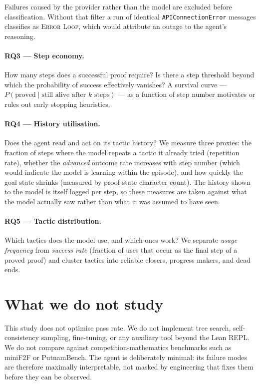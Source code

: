 Failures caused by the provider rather than the model are excluded before
classification. Without that filter a run of identical \texttt{APIConnectionError}
messages classifies as \textsc{Error Loop}, which would attribute an outage to the
agent's reasoning.

\paragraph{RQ3 --- Step economy.}
How many steps does a successful proof require?
Is there a step threshold beyond which the probability of success effectively vanishes?
A survival curve --- $P(\text{proved} \mid \text{still alive after } k \text{ steps})$ ---
as a function of step number motivates or rules out early stopping heuristics.

\paragraph{RQ4 --- History utilisation.}
Does the agent read and act on its tactic history?
We measure three proxies: the fraction of steps where the model repeats a tactic it already tried
(repetition rate), whether the \emph{advanced} outcome rate increases with step number
(which would indicate the model is learning within the episode),
and how quickly the goal state shrinks (measured by proof-state character count).
The history shown to the model is itself logged per step, so these measures are taken
against what the model actually saw rather than what it was assumed to have seen.

\paragraph{RQ5 --- Tactic distribution.}
Which tactics does the model use, and which ones work?
We separate \emph{usage frequency} from \emph{success rate} (fraction of uses that occur
as the final step of a proved proof) and cluster tactics into reliable closers,
progress makers, and dead ends.

\section{What we do not study}

This study does not optimise pass rate.
We do not implement tree search, self-consistency sampling, fine-tuning,
or any auxiliary tool beyond the Lean REPL.
We do not compare against competition-mathematics benchmarks such as miniF2F or PutnamBench.
The agent is deliberately minimal: its failure modes are therefore maximally interpretable,
not masked by engineering that fixes them before they can be observed.

